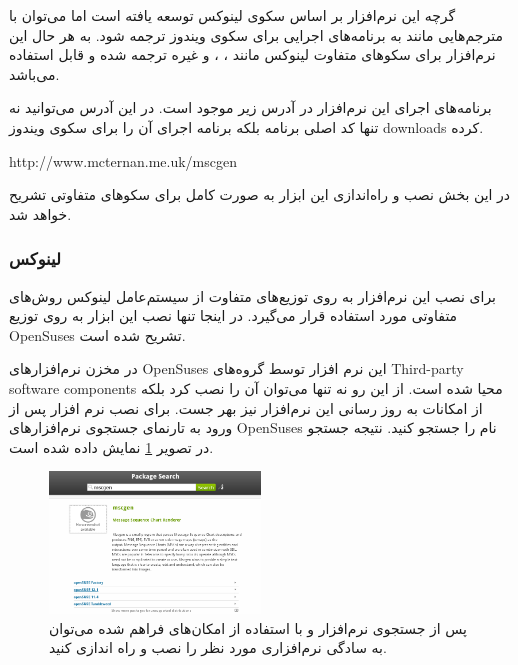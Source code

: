 گرچه این نرم‌افزار بر اساس سکوی لینوکس توسعه یافته است اما می‌توان با مترجم‌هایی
مانند  به برنامه‌های اجرایی برای سکوی ویندوز ترجمه شود. به هر حال این
نرم‌افزار برای سکو‌های متفاوت لینوکس مانند ، ،
 و غیره ترجمه شده و قابل استفاده می‌باشد.

\begin{webreference}
برنامه‌های اجرای این نرم‌افزار در آدرس زیر موجود است. در این آدرس می‌توانید نه
تنها کد اصلی برنامه بلکه برنامه اجرای آن را برای سکوی ویندوز \glspl{download}
کرده.

\begin{latin}
http://www.mcternan.me.uk/mscgen
\end{latin}
\end{webreference}

در این بخش نصب و راه‌اندازی این ابزار به صورت کامل برای سکوهای متفاوتی تشریح
خواهد شد.


\subsubsection{لینوکس}

برای نصب این نرم‌افزار به روی توزیع‌های متفاوت از سیستم‌عامل لینوکس روش‌های
متفاوتی مورد استفاده قرار می‌گیرد. در اینجا تنها نصب این ابزار به روی توزیع
\glspl{OpenSuse} تشریح شده است.

در مخزن نرم‌افزارهای \glspl{OpenSuse} این نرم افزار توسط گروه‌های 
\glspl{Third-party software component} محیا شده است. از این رو نه تنها می‌توان آن را نصب کرد بلکه
از امکانات به روز رسانی این نرم‌افزار نیز بهر جست. برای نصب نرم افزار پس از ورود
به تارنمای جستجوی نرم‌افزارهای \glspl{OpenSuse} نام  را جستجو کنید.
نتیجه جستجو در تصویر \ref{image/write/graph/mscgen/install-OpenSuse-1} نمایش
داده شده است.

\begin{figure}
	\centering
	\includegraphics[width=0.5\textwidth]{image/write/graph/mscgen/install-OpenSuse-1}
	\caption[جستجوی نرم‌افزار  در موتور جستجوی ]{
		پس از جستجوی نرم‌افزار  و با استفاده از امکان‌های فراهم شده می‌توان
		به سادگی نرم‌افزاری مورد نظر را نصب و راه اندازی کنید.
	}
	\label{image/write/graph/mscgen/install-OpenSuse-1}
\end{figure}

